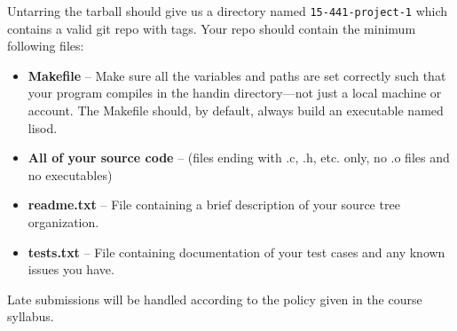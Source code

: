 Untarring the tarball should give us a directory named \texttt{15-441-project-1} which contains a valid git repo with tags. Your repo should contain the minimum following files:
\begin{itemize}
	\item \textbf{Makefile} -- Make sure all the variables and paths are set
      correctly such that your program compiles in the handin directory---not
      just a local machine or account. The Makefile should, by default, always
      build an executable named lisod.
	\item \textbf{All of your source code} -- (files ending with .c, .h,
      etc. only, no .o files and no executables)
	\item \textbf{readme.txt} -- File containing a brief description of your source tree organization.
	
	\item \textbf{tests.txt} -- File containing documentation of your test cases
      and any known issues you have.
\end{itemize}

	Late submissions will be handled according to the policy given in the
        course syllabus.



